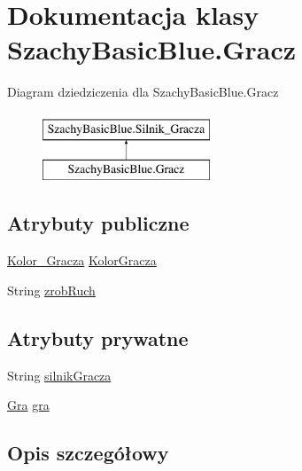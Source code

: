 \hypertarget{class_szachy_basic_blue_1_1_gracz}{\section{Dokumentacja klasy Szachy\-Basic\-Blue.\-Gracz}
\label{class_szachy_basic_blue_1_1_gracz}
}
Diagram dziedziczenia dla Szachy\-Basic\-Blue.\-Gracz\begin{figure}[H]
\begin{center}
\leavevmode
\includegraphics[height=2.000000cm]{class_szachy_basic_blue_1_1_gracz}
\end{center}
\end{figure}
\subsection*{Atrybuty publiczne}
\begin{DoxyCompactItemize}
\item 
\hyperlink{namespace_szachy_basic_blue_a247cb874e8c4304fa09e07a257a78277}{Kolor\-\_\-\-Gracza} \hyperlink{class_szachy_basic_blue_1_1_gracz_a1ead8290dd8833563a97ab2a9ee47f7c}{Kolor\-Gracza}
\item 
String \hyperlink{class_szachy_basic_blue_1_1_gracz_a197b73341a7fd21ebe1f036f12c02bd3}{zrob\-Ruch}
\end{DoxyCompactItemize}
\subsection*{Atrybuty prywatne}
\begin{DoxyCompactItemize}
\item 
String \hyperlink{class_szachy_basic_blue_1_1_gracz_ad8698b29d6554cefa6143fb2d8b69451}{silnik\-Gracza}
\item 
\hyperlink{class_szachy_basic_blue_1_1_gra}{Gra} \hyperlink{class_szachy_basic_blue_1_1_gracz_a87917de01bff4f9a56543f05b95bd4d3}{gra}
\end{DoxyCompactItemize}


\subsection{Opis szczegółowy}


